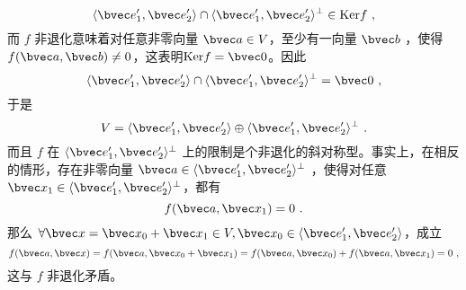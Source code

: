 \begin{equation}
\langle\bvec e'_1,\bvec e'_2\rangle\cap\langle\bvec e'_1,\bvec e'_2\rangle^{\perp}\in \mathrm{Ker} f~,
\end{equation}
而 $f$ 非退化意味着对任意非零向量 $\bvec a\in V$，至少有一向量 $\bvec b$ ，使得 $f(\bvec a,\bvec b)\neq0$，这表明$\mathrm{Ker} f=\bvec 0$。因此
\begin{equation}
\langle\bvec e'_1,\bvec e'_2\rangle\cap\langle\bvec e'_1,\bvec e'_2\rangle^{\perp}=\bvec 0~,
\end{equation}
于是
\begin{equation}
V=\langle\bvec e'_1,\bvec e'_2\rangle\oplus\langle\bvec e'_1,\bvec e'_2\rangle^{\perp}~.
\end{equation}
而且 $f$ 在 $\langle\bvec e'_1,\bvec e'_2\rangle^{\perp}$ 上的限制是个非退化的斜对称型。事实上，在相反的情形，存在非零向量 $\bvec a\in \langle\bvec e'_1,\bvec e'_2\rangle^{\perp}$ ，使得对任意 $\bvec x_1\in\langle\bvec e'_1,\bvec e'_2\rangle^{\perp}$，都有
\begin{equation}
f(\bvec a,\bvec x_1)=0~.
\end{equation}
那么 $\forall \bvec x=\bvec x_0+\bvec x_1\in V,\bvec x_0\in\langle\bvec e'_1,\bvec e'_2\rangle$，成立
\begin{equation}
f(\bvec a,\bvec x)=f(\bvec a,\bvec x_0+\bvec x_1)=f(\bvec a,\bvec x_0)+f(\bvec a,\bvec x_1)=0~,
\end{equation}
这与 $f$ 非退化矛盾。

